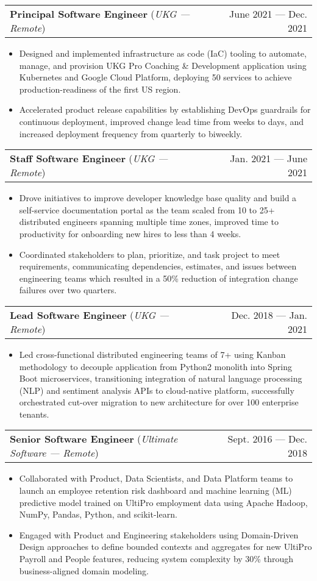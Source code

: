 \documentclass[letterpaper,10pt]{article}
\makeatletter
\newcommand{\experienceHeading}[4]{
  \item
    \begin{tabular*}{\textwidth}[t]{l@{\extracolsep{\fill}}r}
      \textbf{#1} (\textit{\small#3 --- \textit{\small #4}})& #2 \\
    \end{tabular*}\vspace{-4pt}
}
\newcommand{\experienceStart}{\begin{itemize}[leftmargin=16pt, rightmargin=8pt]}
\newcommand{\experienceEnd}{\end{itemize}\vspace{-7pt}}
\newcommand{\experience}[1]{\item\small{{#1 \vspace{-0.5pt}}}}
\makeatother
\begin{document}
  \experienceHeading{Principal Software Engineer}
    {June 2021 --- Dec. 2021}
    {UKG}
    {Remote}
  \experienceStart{}
    \experience{
      Designed and implemented infrastructure as code (IaC) tooling to automate, manage, and provision UKG Pro Coaching \& Development application using Kubernetes and Google Cloud Platform, deploying 50 services to achieve production-readiness of the first US region.
    }
    \experience{
      Accelerated product release capabilities by establishing DevOps guardrails for continuous deployment, improved change lead time from weeks to days, and increased deployment frequency from quarterly to biweekly.
    }
  \experienceEnd{}

  \experienceHeading{Staff Software Engineer}
    {Jan. 2021 --- June 2021}
    {UKG}
    {Remote}
  \experienceStart{}
    \experience{
      Drove initiatives to improve developer knowledge base quality and build a self-service documentation portal as the team scaled from 10 to 25+ distributed engineers spanning multiple time zones, improved time to productivity for onboarding new hires to less than 4 weeks.
    }
    \experience{
      Coordinated stakeholders to plan, prioritize, and task project to meet requirements, communicating dependencies, estimates, and issues between engineering teams which resulted in a 50\% reduction of integration change failures over two quarters.
    }
  \experienceEnd{}

  \experienceHeading{Lead Software Engineer}
    {Dec. 2018 --- Jan. 2021}
    {UKG}
    {Remote}
  \experienceStart{}
    \experience{
      Led cross-functional distributed engineering teams of 7+ using Kanban methodology to decouple application from Python2 monolith into Spring Boot microservices, transitioning integration of natural language processing (NLP) and sentiment analysis APIs to cloud-native platform, successfully orchestrated cut-over migration to new architecture for over 100 enterprise tenants.
    }
  \experienceEnd{}

  \experienceHeading{Senior Software Engineer}
    {Sept. 2016 --- Dec. 2018}
    {Ultimate Software}
    {Remote}
  \experienceStart{}
    \experience{
      Collaborated with Product, Data Scientists, and Data Platform teams to launch an employee retention risk dashboard and machine learning (ML) predictive model trained on UltiPro employment data using Apache Hadoop, NumPy, Pandas, Python, and scikit-learn.
    }
    \experience{
      Engaged with Product and Engineering stakeholders using Domain-Driven Design approaches to define bounded contexts and aggregates for new UltiPro Payroll and People features, reducing system complexity by 30\% through business-aligned domain modeling.
    }
  \experienceEnd{}
\end{document}
